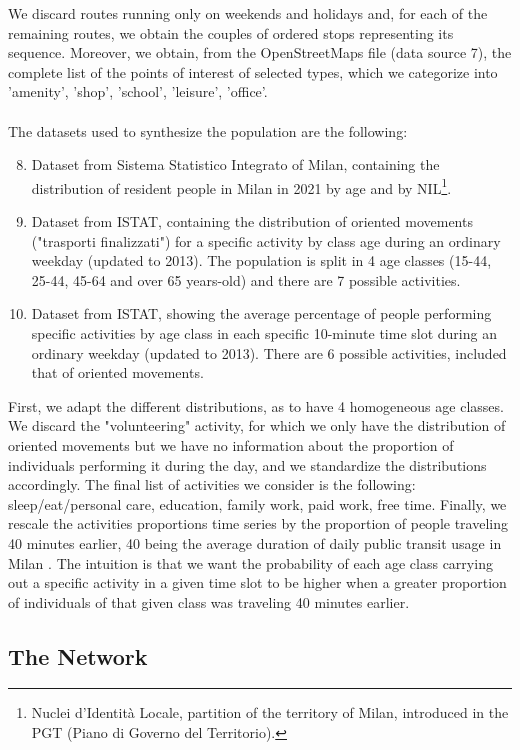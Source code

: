 We discard routes running only on weekends and holidays and, for each of the remaining routes, we obtain the couples of ordered stops representing its sequence. Moreover, we obtain, from the OpenStreetMaps file (data source 7), the complete list of the points of interest of selected types, which we categorize into 'amenity', 'shop', 'school', 'leisure', 'office'. \\\\
The datasets used to synthesize the population are the following:
\begin{enumerate}
\setcounter{enumi}{7}
    \item Dataset \cite{site18} from Sistema Statistico Integrato of Milan, containing the distribution of resident people in Milan in 2021 by age and by NIL\footnote{Nuclei d'Identità Locale, partition of the territory of Milan, introduced in the PGT (Piano di Governo del Territorio).}.
    \item Dataset \cite{site10} from ISTAT, containing the distribution of oriented movements ("trasporti finalizzati") for a specific activity by class age during an ordinary weekday (updated to 2013). The population is split in 4 age classes (15-44, 25-44, 45-64 and over 65 years-old) and there are 7 possible activities.
    \item Dataset \cite{site11} from ISTAT, showing the average percentage of people performing specific activities by age class in each specific 10-minute time slot during an ordinary weekday (updated to 2013). There are 6 possible activities, included that of oriented movements.
\end{enumerate}
First, we adapt the different distributions, as to have 4 homogeneous age classes. We discard the "volunteering" activity, for which we only have the distribution of oriented movements but we have no information about the proportion of individuals performing it during the day, and we standardize the distributions accordingly. The final list of activities we consider is the following: sleep/eat/personal care, education, family work, paid work, free time. Finally, we rescale the activities proportions time series by the proportion of people traveling 40 minutes earlier, 40 being the average duration of daily public transit usage in Milan \cite{bib2}. The intuition is that we want the probability of each age class carrying out a specific activity in a given time slot to be higher when a greater proportion of individuals of that given class was traveling 40 minutes earlier.

\subsection{The Network}\label{sec3}

